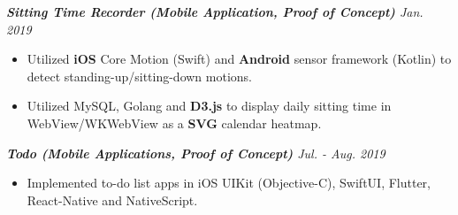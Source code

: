 \documentclass[10pt]{article}
\begin{document}
\vspace{0.5em}
%
{\itshape {\bfseries Sitting Time Recorder (Mobile Application, Proof of Concept)}  \hfill Jan. 2019}
\begin{itemize}[leftmargin=15pt, noitemsep, topsep=0pt]
\item Utilized \textbf{iOS} Core Motion (Swift) and \textbf{Android} sensor framework (Kotlin) to detect standing-up/sitting-down motions.
\item Utilized MySQL, Golang and \textbf{D3.js} to display daily sitting time in WebView/WKWebView as a \textbf{SVG} calendar heatmap.
\end{itemize}
\vspace{0.5em}
%
{\itshape {\bfseries Todo (Mobile Applications, Proof of Concept)}  \hfill Jul. - Aug. 2019}
\begin{itemize}[leftmargin=15pt, noitemsep, topsep=0pt]
\item Implemented to-do list apps in iOS UIKit (Objective-C), SwiftUI, Flutter, React-Native and NativeScript.
\end{itemize}
\vspace{0.5em}
\end{document}
